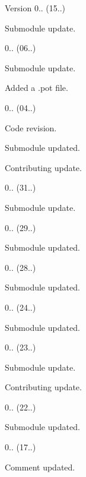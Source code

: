 \begin{DoxyVersion}{Version}
0.. (15..)
\begin{DoxyItemize}
\item Submodule update. 
\end{DoxyItemize}

0.. (06..)
\begin{DoxyItemize}
\item Submodule update.
\item Added a .pot file. 
\end{DoxyItemize}

0.. (04..)
\begin{DoxyItemize}
\item Code revision.
\item Submodule updated.
\item Contributing update. 
\end{DoxyItemize}

0.. (31..)
\begin{DoxyItemize}
\item Submodule update. 
\end{DoxyItemize}

0.. (29..)
\begin{DoxyItemize}
\item Submodule updated. 
\end{DoxyItemize}

0.. (28..)
\begin{DoxyItemize}
\item Submodule updated. 
\end{DoxyItemize}

0.. (24..)
\begin{DoxyItemize}
\item Submodule updated. 
\end{DoxyItemize}

0.. (23..)
\begin{DoxyItemize}
\item Submodule update.
\item Contributing update. 
\end{DoxyItemize}

0.. (22..)
\begin{DoxyItemize}
\item Submodule updated. 
\end{DoxyItemize}

0.. (17..)
\begin{DoxyItemize}
\item Comment updated. 
\end{DoxyItemize}


\end{DoxyVersion}
